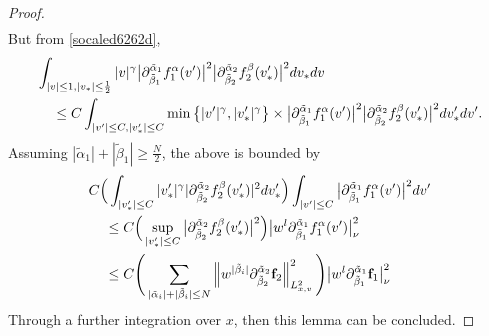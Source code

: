 \documentclass[reqno]{amsart}
\numberwithin{equation}{section}
\numberwithin{equation}{section}
\begin{document}
\begin{proof}
\begin{align*}
	\end{align*}
	But from \eqref{socaled6262d},
	\begin{align*}
		&\int_{|v|\leq1,|v_*|\leq \frac{1}{2}} |v|^\gamma \big| \partial_{\tilde{\beta}_1}^{\tilde{\alpha}_1}f^{\alpha}_1 (v') \big|^2 \big| \partial_{\tilde{\beta}_2}^{\tilde{\alpha}_2}f^{\beta}_2 (v_*') \big|^2  dv_* dv \\
		&\hspace{0.4cm}\leq C \int_{|v'|\leq C,|v_*'|\leq C} \min\big\{ |v'|^\gamma, |v_*'|^\gamma \big\} \times \big| \partial_{\tilde{\beta}_1}^{\tilde{\alpha}_1}f^{\alpha}_1 (v') \big|^2 \big| \partial_{\tilde{\beta}_2}^{\tilde{\alpha}_2}f^{\beta}_2 (v_*') \big|^2 dv_*'dv'.
	\end{align*}
	Assuming  $|\tilde{\alpha}_1| + |\tilde{\beta}_1| \geq \frac{N}{2}$,  the above is bounded by 
	\begin{align*}
		&C \Big( \int_{|v_*'| \le C} |v_*'|^\gamma | \partial_{\tilde{\beta}_2}^{\tilde{\alpha}_2}f^{\beta}_2 (v_*') |^2 dv_*' \Big) \int_{|v'| \leq C} \big|\partial_{\tilde{\beta}_1}^{\tilde{\alpha}_1}f^{\alpha}_1 (v')\big|^2 dv' \\
		&\hspace{0.4cm}\leq C \Big(\sup_{|v_*'| \le C} \big| \partial_{\tilde{\beta}_2}^{\tilde{\alpha}_2}f^{\beta}_2 (v_*') \big|^2\Big) \big|w^{l}\partial_{\tilde{\beta}_1}^{\tilde{\alpha}_1}f^{\alpha}_1 (v')\big|^2_{\nu} \\
		&\hspace{0.4cm}\leq C \Bigg(\sum_{|\tilde{\alpha}_i| + |\tilde{\beta}_i| \le N} \left\| w^{|\tilde{\beta}_i|} \partial_{\tilde{\beta}_2}^{\tilde{\alpha}_2}\mathbf{f}_2 \right\|_{L^{2}_{x,v}}^2 \Bigg) \big|w^{l}\partial_{\tilde{\beta}_1}^{\tilde{\alpha}_1}\mathbf{f}_1 \big|^2_{\nu}
	\end{align*}
	Through a further integration over $x$, then this lemma can be concluded.
	\end{proof}
		
\end{document}
